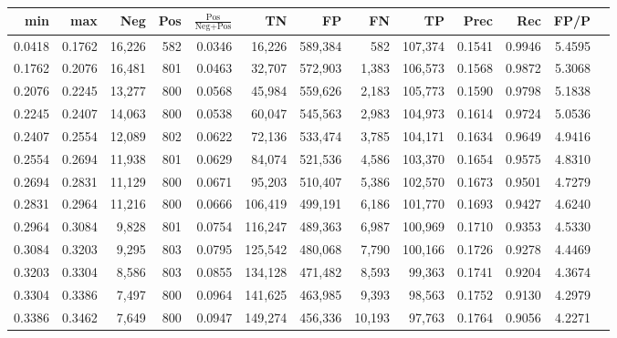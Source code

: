 \begin{tabular}{rrrrrrrrrrrrr}
\toprule
   min &    max &    Neg & Pos & $\frac{\text{Pos}}{\text{Neg}+\text{Pos}}$ &      TN &      FP &      FN &      TP &   Prec &    Rec &   FP/P \\
\midrule
0.0418 & 0.1762 & 16,226 & 582 &                                     0.0346 &  16,226 & 589,384 &     582 & 107,374 & 0.1541 & 0.9946 & 5.4595 \\
0.1762 & 0.2076 & 16,481 & 801 &                                     0.0463 &  32,707 & 572,903 &   1,383 & 106,573 & 0.1568 & 0.9872 & 5.3068 \\
0.2076 & 0.2245 & 13,277 & 800 &                                     0.0568 &  45,984 & 559,626 &   2,183 & 105,773 & 0.1590 & 0.9798 & 5.1838 \\
0.2245 & 0.2407 & 14,063 & 800 &                                     0.0538 &  60,047 & 545,563 &   2,983 & 104,973 & 0.1614 & 0.9724 & 5.0536 \\
0.2407 & 0.2554 & 12,089 & 802 &                                     0.0622 &  72,136 & 533,474 &   3,785 & 104,171 & 0.1634 & 0.9649 & 4.9416 \\
0.2554 & 0.2694 & 11,938 & 801 &                                     0.0629 &  84,074 & 521,536 &   4,586 & 103,370 & 0.1654 & 0.9575 & 4.8310 \\
0.2694 & 0.2831 & 11,129 & 800 &                                     0.0671 &  95,203 & 510,407 &   5,386 & 102,570 & 0.1673 & 0.9501 & 4.7279 \\
0.2831 & 0.2964 & 11,216 & 800 &                                     0.0666 & 106,419 & 499,191 &   6,186 & 101,770 & 0.1693 & 0.9427 & 4.6240 \\
0.2964 & 0.3084 &  9,828 & 801 &                                     0.0754 & 116,247 & 489,363 &   6,987 & 100,969 & 0.1710 & 0.9353 & 4.5330 \\
0.3084 & 0.3203 &  9,295 & 803 &                                     0.0795 & 125,542 & 480,068 &   7,790 & 100,166 & 0.1726 & 0.9278 & 4.4469 \\
0.3203 & 0.3304 &  8,586 & 803 &                                     0.0855 & 134,128 & 471,482 &   8,593 &  99,363 & 0.1741 & 0.9204 & 4.3674 \\
0.3304 & 0.3386 &  7,497 & 800 &                                     0.0964 & 141,625 & 463,985 &   9,393 &  98,563 & 0.1752 & 0.9130 & 4.2979 \\
0.3386 & 0.3462 &  7,649 & 800 &                                     0.0947 & 149,274 & 456,336 &  10,193 &  97,763 & 0.1764 & 0.9056 & 4.2271 \\

\end{tabular}
